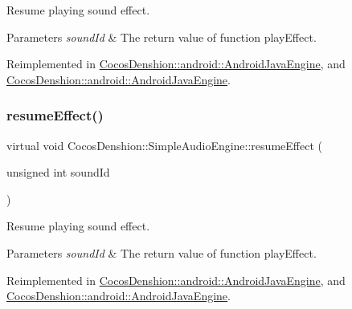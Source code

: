 Resume playing sound effect.


\begin{DoxyParams}{Parameters}
{\em sound\+Id} & The return value of function play\+Effect. \\
\hline
\end{DoxyParams}


Reimplemented in \hyperlink{classCocosDenshion_1_1android_1_1AndroidJavaEngine_a8c703b591bb1992c32915b375689dc39}{Cocos\+Denshion\+::android\+::\+Android\+Java\+Engine}, and \hyperlink{classCocosDenshion_1_1android_1_1AndroidJavaEngine_a0403188379ce32b1598292bcdf49c07d}{Cocos\+Denshion\+::android\+::\+Android\+Java\+Engine}.

\mbox{\label{classCocosDenshion_1_1SimpleAudioEngine_a51fe336239471376ed6d5ed35dc2396e}} 
\subsubsection{\texorpdfstring{resume\+Effect()}{resumeEffect()}\hspace{0.1cm}{\footnotesize\ttfamily [2/2]}}
{\footnotesize\ttfamily virtual void Cocos\+Denshion\+::\+Simple\+Audio\+Engine\+::resume\+Effect (\begin{DoxyParamCaption}\item[{unsigned int}]{sound\+Id }\end{DoxyParamCaption})\hspace{0.3cm}{\ttfamily [virtual]}}

Resume playing sound effect.


\begin{DoxyParams}{Parameters}
{\em sound\+Id} & The return value of function play\+Effect. \\
\hline
\end{DoxyParams}


Reimplemented in \hyperlink{classCocosDenshion_1_1android_1_1AndroidJavaEngine_a8c703b591bb1992c32915b375689dc39}{Cocos\+Denshion\+::android\+::\+Android\+Java\+Engine}, and \hyperlink{classCocosDenshion_1_1android_1_1AndroidJavaEngine_a0403188379ce32b1598292bcdf49c07d}{Cocos\+Denshion\+::android\+::\+Android\+Java\+Engine}.

